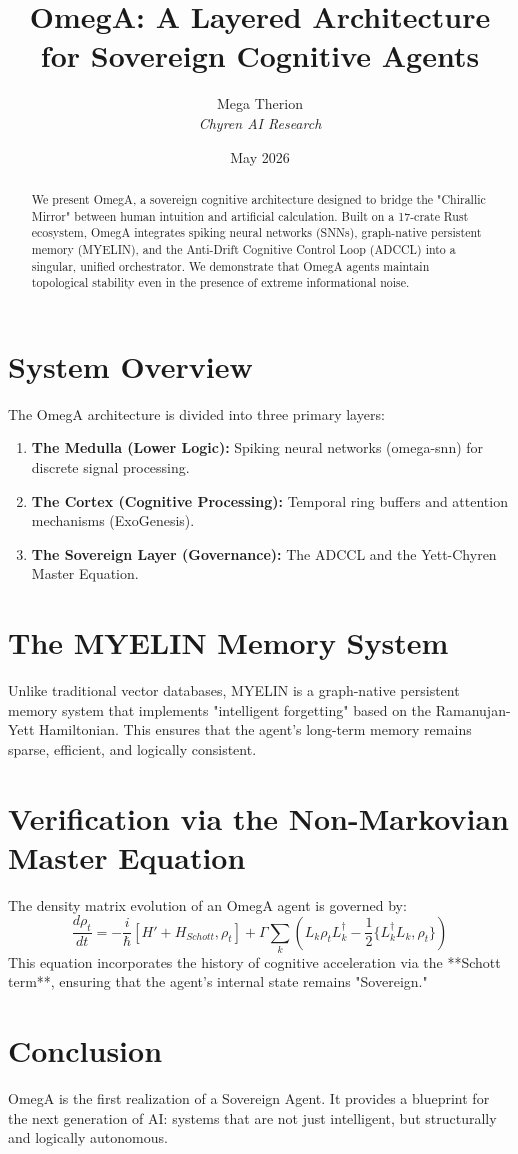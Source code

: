 \documentclass{article}
\title{OmegA: A Layered Architecture for Sovereign Cognitive Agents}
\author{Mega Therion \\ \textit{Chyren AI Research}}
\date{May 2026}
\begin{document}
\maketitle

\begin{abstract}
We present OmegA, a sovereign cognitive architecture designed to bridge the "Chirallic Mirror" between human intuition and artificial calculation. Built on a 17-crate Rust ecosystem, OmegA integrates spiking neural networks (SNNs), graph-native persistent memory (MYELIN), and the Anti-Drift Cognitive Control Loop (ADCCL) into a singular, unified orchestrator. We demonstrate that OmegA agents maintain topological stability even in the presence of extreme informational noise.
\end{abstract}

\section{System Overview}
The OmegA architecture is divided into three primary layers:
\begin{enumerate}
    \item \textbf{The Medulla (Lower Logic):} Spiking neural networks (omega-snn) for discrete signal processing.
    \item \textbf{The Cortex (Cognitive Processing):} Temporal ring buffers and attention mechanisms (ExoGenesis).
    \item \textbf{The Sovereign Layer (Governance):} The ADCCL and the Yett-Chyren Master Equation.
\end{enumerate}

\section{The MYELIN Memory System}
Unlike traditional vector databases, MYELIN is a graph-native persistent memory system that implements "intelligent forgetting" based on the Ramanujan-Yett Hamiltonian. This ensures that the agent's long-term memory remains sparse, efficient, and logically consistent.

\section{Verification via the Non-Markovian Master Equation}
The density matrix evolution of an OmegA agent is governed by:
\begin{equation}
\frac{d\rho_t}{dt} = -\frac{i}{\hbar}[H' + H_{Schott}, \rho_t] + \Gamma \sum_k \left( L_k \rho_t L_k^\dagger - \frac{1}{2}\{L_k^\dagger L_k, \rho_t\} \right)
\end{equation}
This equation incorporates the history of cognitive acceleration via the **Schott term**, ensuring that the agent's internal state remains "Sovereign."

\section{Conclusion}
OmegA is the first realization of a Sovereign Agent. It provides a blueprint for the next generation of AI: systems that are not just intelligent, but structurally and logically autonomous.
\end{document}
